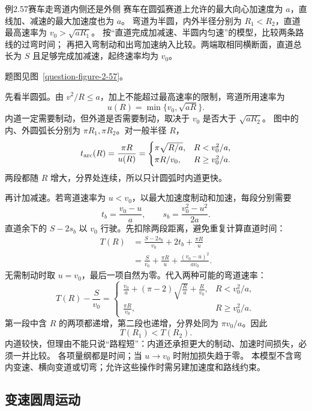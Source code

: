 \begin{origexamplebox}{例2.57\quad 赛车走弯道内侧还是外侧}
赛车在圆弧赛道上允许的最大向心加速度为 $a$，直线加、减速的最大加速度也为 $a$。
弯道为半圆，内外半径分别为 $R_1<R_2$，直道最高速率为 $v_0>\sqrt{aR_1}$。
按“直道完成加减速、半圆内匀速”的模型，比较两条路线的过弯时间；
再把入弯制动和出弯加速纳入比较。两端取相同横断面，直道总长为 $S$ 且足够完成加减速，起终速率均为 $v_0$。
\par 题图见图~\ref{question-figure-2-57}。
\KQuestionCF
\end{origexamplebox}
\begin{xesolution}
先看半圆弧。由 $v^2/R\le a$，加上不能超过最高速率的限制，弯道所用速率为
\[
 u(R)=\min\{v_0,\sqrt{aR}\}.
\]
内道一定需要制动，但外道是否需要制动，取决于 $v_0$ 是否大于 $\sqrt{aR_2}$。
\RacetrackDiagram
图中的内、外圆弧长分别为 $\pi R_1,\pi R_2$。对一般半径 $R$，
\[
 t_{\rm arc}(R)=\frac{\pi R}{u(R)}
 =\begin{cases}\pi\sqrt{R/a},&R<v_0^2/a,\\
 \pi R/v_0,&R\ge v_0^2/a.\end{cases}
\]
两段都随 $R$ 增大，分界处连续，所以只计圆弧时内道更快。

再计加减速。若弯道速率为 $u<v_0$，以最大加速度制动和加速，每段分别需要
\[
 t_b=\frac{v_0-u}{a},\qquad s_b=\frac{v_0^2-u^2}{2a}.
\]
直道余下的 $S-2s_b$ 以 $v_0$ 行驶。先扣除两段距离，避免重复计算直道时间：
\begin{align*}
 T(R)&=\frac{S-2s_b}{v_0}+2t_b+\frac{\pi R}{u}\\
 &=\frac S{v_0}+\frac{\pi R}{u}+\frac{(v_0-u)^2}{av_0}.
\end{align*}
无需制动时取 $u=v_0$，最后一项自然为零。代入两种可能的弯道速率：
\[
 T(R)-\frac S{v_0}
 =\begin{cases}
 \displaystyle\frac{v_0}{a}+(\pi-2)\sqrt{\frac Ra}+\frac R{v_0},
 &R<v_0^2/a,\\[2mm]
 \displaystyle\frac{\pi R}{v_0},&R\ge v_0^2/a.
 \end{cases}
\]
第一段中含 $R$ 的两项都递增，第二段也递增，分界处同为 $\pi v_0/a$。因此
\[
 \boxed{T(R_1)<T(R_2)}.
\]
内道较快，但理由不能只说“路程短”：内道还承担更大的制动、加速时间损失，必须一并比较。
各项量纲都是时间；当 $u\to v_0$ 时附加损失趋于零。
本模型不含弯内变速、横向变道或切弯；允许这些操作时需另建加速度和路线约束。
\end{xesolution}

\subsection{变速圆周运动}

